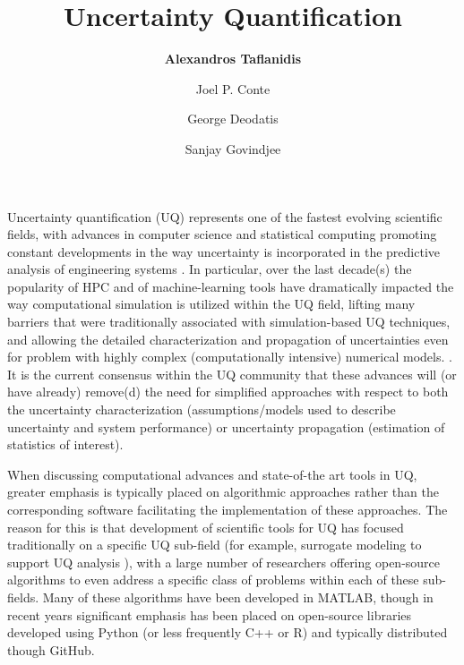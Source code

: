 %
%
%


\title{Uncertainty Quantification}
\author{
    \textbf{Alexandros Taflanidis}
    \and Joel P. Conte
    \and George Deodatis
    \and Sanjay Govindjee}
\tocauthor{}
%
%
\maketitle

Uncertainty quantification (UQ) represents one of the fastest evolving scientific fields, with advances in computer science and statistical computing promoting constant developments in the way uncertainty is incorporated in the predictive analysis of engineering systems \citep{smith2013uncertainty}. In particular, over the last decade(s) the popularity of HPC and of machine-learning tools have dramatically impacted the way computational simulation is utilized within the UQ field, lifting many barriers that were traditionally associated with simulation-based UQ techniques, and allowing the detailed characterization and propagation of uncertainties even for problem with highly complex (computationally intensive) numerical models. . It is the current consensus within the UQ community that these advances will (or have already) remove(d) the need for simplified approaches with respect to both the uncertainty characterization (assumptions/models used to describe uncertainty and system performance) or uncertainty propagation (estimation of statistics of interest). 

When discussing computational advances and state-of-the art tools in UQ, greater emphasis is typically placed on algorithmic approaches rather than the corresponding software facilitating the implementation of these approaches. The reason for this is that development of scientific tools for UQ has focused traditionally on a specific UQ sub-field (for example, surrogate modeling to support UQ analysis \citep{lophaven2002dacea,gorissen2010surrogate}), with a large number of researchers \citep[e.g.,][]{bect2017bayesian,clement2018methods} offering open-source algorithms to even address a specific class of problems within each of these sub-fields. Many of these algorithms have been developed in MATLAB, though in recent years significant emphasis has been placed on open-source libraries developed using Python (or less frequently C++ or R) and typically distributed though GitHub.    

